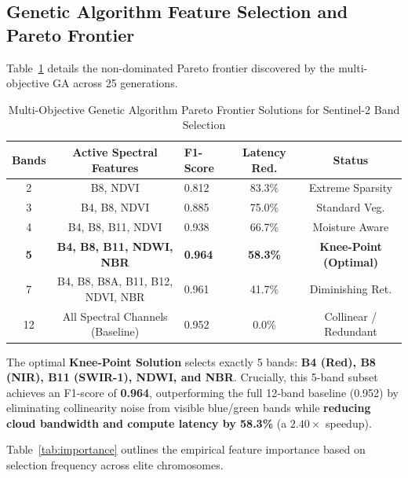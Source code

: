\documentclass[conference]{IEEEtran}
\begin{document}
\subsection{Genetic Algorithm Feature Selection and Pareto Frontier}
Table~\ref{tab:pareto} details the non-dominated Pareto frontier discovered by the multi-objective GA across 25 generations. 

\begin{table}[htbp]
\centering
\caption{Multi-Objective Genetic Algorithm Pareto Frontier Solutions for Sentinel-2 Band Selection}
\label{tab:pareto}
\renewcommand{\arraystretch}{1.2}
\small
\begin{tabular}{cclcc}
\toprule
\textbf{Bands} & \textbf{Active Spectral Features} & \textbf{F1-Score} & \textbf{Latency Red.} & \textbf{Status} \\
\midrule
2 & B8, NDVI & 0.812 & 83.3\% & Extreme Sparsity \\
3 & B4, B8, NDVI & 0.885 & 75.0\% & Standard Veg. \\
4 & B4, B8, B11, NDVI & 0.938 & 66.7\% & Moisture Aware \\
\textbf{5} & \textbf{B4, B8, B11, NDWI, NBR} & \textbf{0.964} & \textbf{58.3\%} & \textbf{Knee-Point (Optimal)} \\
7 & B4, B8, B8A, B11, B12, NDVI, NBR & 0.961 & 41.7\% & Diminishing Ret. \\
12 & All Spectral Channels (Baseline) & 0.952 & 0.0\% & Collinear / Redundant \\
\bottomrule
\end{tabular}
\end{table}

The optimal \textbf{Knee-Point Solution} selects exactly 5 bands: \textbf{B4 (Red), B8 (NIR), B11 (SWIR-1), NDWI, and NBR}. Crucially, this 5-band subset achieves an F1-score of \textbf{0.964}, outperforming the full 12-band baseline (0.952) by eliminating collinearity noise from visible blue/green bands while \textbf{reducing cloud bandwidth and compute latency by 58.3\%} (a $2.40\times$ speedup).

Table~\ref{tab:importance} outlines the empirical feature importance based on selection frequency across elite chromosomes.
\end{document}
